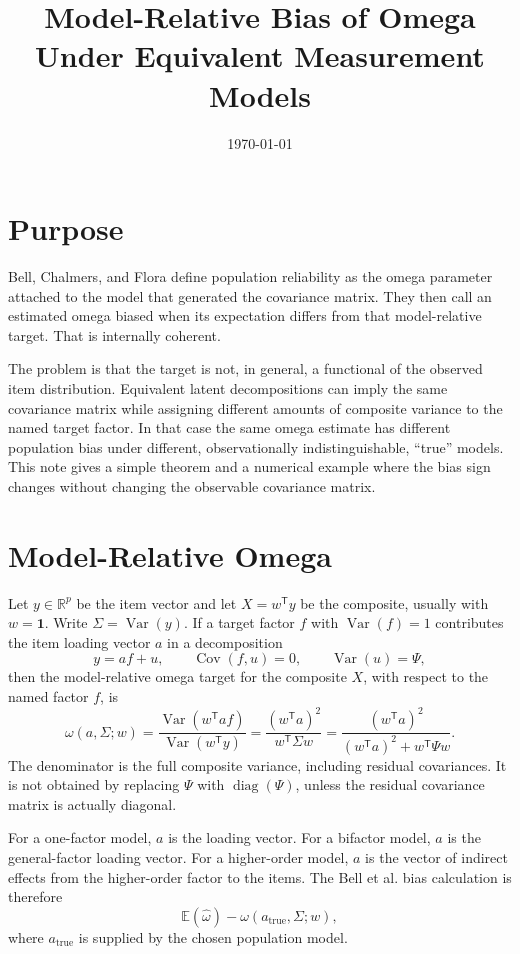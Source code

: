 \documentclass[11pt]{article}
\title{Model-Relative Bias of Omega Under Equivalent Measurement Models}
\author{}
\date{\today}
\newcommand{\E}{\mathbb{E}}
\newcommand{\Var}{\operatorname{Var}}
\newcommand{\Cov}{\operatorname{Cov}}
\newcommand{\T}{^{\mathsf T}}
\theoremstyle{plain}
\theoremstyle{remark}
\begin{document}
\maketitle

\section*{Purpose}

Bell, Chalmers, and Flora \cite{bell2024} define population reliability as the
omega parameter attached to the model that generated the covariance matrix.
They then call an estimated omega biased when its expectation differs from that
model-relative target. That is internally coherent.

The problem is that the target is not, in general, a functional of the observed
item distribution. Equivalent latent decompositions can imply the same
covariance matrix while assigning different amounts of composite variance to the
named target factor. In that case the same omega estimate has different
population bias under different, observationally indistinguishable, ``true''
models. This note gives a simple theorem and a numerical example where the bias
sign changes without changing the observable covariance matrix.

\section{Model-Relative Omega}

Let \(y\in\mathbb{R}^p\) be the item vector and let \(X=w\T y\) be the composite,
usually with \(w=\mathbf{1}\). Write \(\Sigma=\Var(y)\). If a target factor \(f\)
with \(\Var(f)=1\) contributes the item loading vector \(a\) in a decomposition
\[
  y=a f+u,\qquad \Cov(f,u)=0,\qquad \Var(u)=\Psi,
\]
then the model-relative omega target for the composite \(X\), with respect to
the named factor \(f\), is
\begin{equation}\label{eq:omega}
  \omega(a,\Sigma;w)
  =
  \frac{\Var(w\T a f)}{\Var(w\T y)}
  =
  \frac{(w\T a)^2}{w\T\Sigma w}
  =
  \frac{(w\T a)^2}{(w\T a)^2+w\T\Psi w}.
\end{equation}
The denominator is the full composite variance, including residual covariances.
It is not obtained by replacing \(\Psi\) with \(\operatorname{diag}(\Psi)\),
unless the residual covariance matrix is actually diagonal.

For a one-factor model, \(a\) is the loading vector. For a bifactor model, \(a\)
is the general-factor loading vector. For a higher-order model, \(a\) is the
vector of indirect effects from the higher-order factor to the items. The
Bell et al. bias calculation is therefore
\[
  \E(\hat\omega)-\omega(a_{\mathrm{true}},\Sigma;w),
\]
where \(a_{\mathrm{true}}\) is supplied by the chosen population model.
\end{document}
